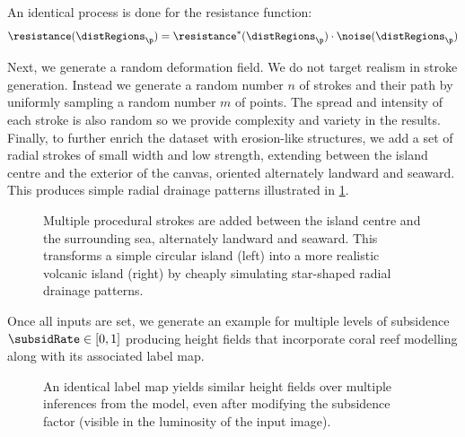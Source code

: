 An identical process is done for the resistance function:
\begin{align}
    \resistance(\distRegions_\p) = \resistance^*(\distRegions_\p) \cdot \noise(\distRegions_\p)
\end{align}

Next, we generate a random deformation field. We do not target realism in stroke generation. Instead we generate a random number $n$ of strokes and their path by uniformly sampling a random number $m$ of points. The spread and intensity of each stroke is also random so we provide complexity and variety in the results.
Finally, to further enrich the dataset with erosion-like structures, we add a set of radial strokes of small width and low strength, extending between the island centre and the exterior of the canvas, oriented alternately landward and seaward. This produces simple radial drainage patterns illustrated in \cref{fig:coral-island-radial-pattern-example}.

\begin{figure}
    \caption[Radial drainage inserted in our dataset generation]{Multiple procedural strokes are added between the island centre and the surrounding sea, alternately landward and seaward. This transforms a simple circular island (left) into a more realistic volcanic island (right) by cheaply simulating star-shaped radial drainage patterns.}
    \label{fig:coral-island-radial-pattern-example}
\end{figure}

Once all inputs are set, we generate an example for multiple levels of subsidence $\subsidRate \in [0, 1]$ producing height fields that incorporate coral reef modelling along with its associated label map.

\begin{figure}
    \caption[Multiple islands generated with two subsidence values]{An identical label map yields similar height fields over multiple inferences from the model, even after modifying the subsidence factor (visible in the luminosity of the input image).}
    \label{fig:coral-island-results-subsidence}
\end{figure}

